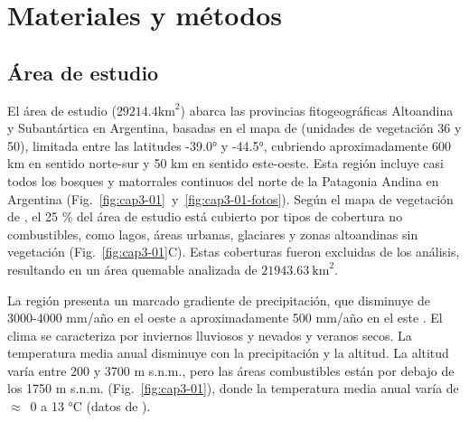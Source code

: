 \section{Materiales y métodos}

\subsection{Área de estudio}\label{cap3:study-area}

El área de estudio ($29214.4 \text{km}^2$) abarca las provincias fitogeográficas Altoandina y Subantártica en Argentina, basadas en el mapa de \citet{oyarzabal_vegetation_2018} (unidades de vegetación 36 y 50), limitada entre las latitudes -39.0° y -44.5°, cubriendo aproximadamente 600 km en sentido norte-sur y 50 km en sentido este-oeste. Esta región incluye casi todos los bosques y matorrales continuos del norte de la Patagonia Andina en Argentina (Fig.~\ref{fig:cap3-01}~y~\ref{fig:cap3-01-fotos}). Según el mapa de vegetación de \citet{lara_vegetacion_1999}, el 25 \% del área de estudio está cubierto por tipos de cobertura no combustibles, como lagos, áreas urbanas, glaciares y zonas altoandinas sin vegetación (Fig.~\ref{fig:cap3-01}C). Estas coberturas fueron excluidas de los análisis, resultando en un área quemable analizada de $21943.63\ \text{km}^2$.

La región presenta un marcado gradiente de precipitación, que disminuye de 3000-4000 mm/año en el oeste a aproximadamente 500 mm/año en el este \citep{villalba_large-scale_2003}. El clima se caracteriza por inviernos lluviosos y nevados y veranos secos. La temperatura media anual disminuye con la precipitación y la altitud. La altitud varía entre 200 y 3700 m s.n.m., pero las áreas combustibles están por debajo de los 1750 m s.n.m. (Fig.~\ref{fig:cap3-01}), donde la temperatura media anual varía de $\approx$~0 a 13 °C (datos de \citet{bianchi_atlas_2010}).

